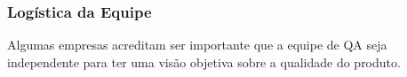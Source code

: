 \documentclass[
	12pt,				%
	openright,			%
	oneside,			%
	a4paper,			%
	english,			%
	brazil,				%
	]{abntex2}
\begin{document}







\subsubsection{Logística da Equipe}
Algumas empresas acreditam ser importante que a equipe de QA seja independente para ter uma visão objetiva sobre a qualidade do produto.
\end{document}
